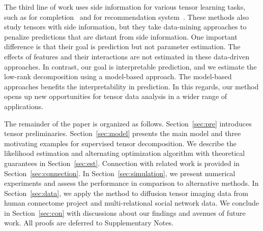 \documentclass[12pt]{article}
\theoremstyle{definition}
\theoremstyle{definition}
\begin{document}
The third line of work uses side information for various tensor learning tasks, such as for completion~\citep{song2019tensor} and for recommendation system~\citep{farias2019learning}. These methods also study tensors with side information, but they take data-mining approaches to penalize predictions that are distant from side information. One important difference is that their goal is prediction but not parameter estimation. The effects of features and their interactions are not estimated in these data-driven approaches. In contrast, our goal is interpretable prediction, and we estimate the low-rank decomposition using a model-based approach.
The model-based approaches benefits the interpretability in prediction. In this regards, our method opens up new opportunities for tensor data analysis in a wider range of applications.


The remainder of the paper is organized as follows. Section~\ref{sec:pre} introduces tensor preliminaries. Section~\ref{sec:model} presents the main model and three motivating examples for supervised tensor decomposition. We describe the likelihood estimation and alternating optimization algorithm with theoretical guarantees in Section~\ref{sec:est}. Connection with related work is provided in Section~\ref{sec:connection}. In Section~\ref{sec:simulation}, we present numerical experiments and assess the performance in comparison to alternative methods. In Section~\ref{sec:data}, we apply the method to diffusion tensor imaging data from human connectome project and multi-relational social network data. We conclude in Section~\ref{sec:con} with discussions about our findings and avenues of future work. All proofs are deferred to Supplementary Notes. 
\end{document}
